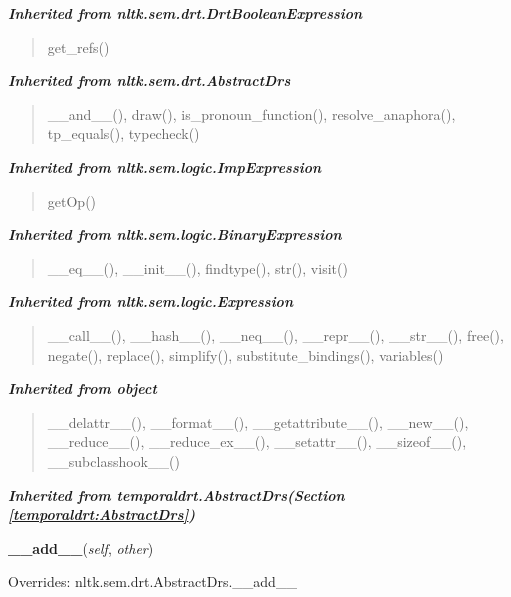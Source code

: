 \large{\textbf{\textit{Inherited from nltk.sem.drt.DrtBooleanExpression}}}

\begin{quote}
get\_refs()
\end{quote}

\large{\textbf{\textit{Inherited from nltk.sem.drt.AbstractDrs}}}

\begin{quote}
\_\_and\_\_(), draw(), is\_pronoun\_function(), resolve\_anaphora(), tp\_equals(), typecheck()
\end{quote}

\large{\textbf{\textit{Inherited from nltk.sem.logic.ImpExpression}}}

\begin{quote}
getOp()
\end{quote}

\large{\textbf{\textit{Inherited from nltk.sem.logic.BinaryExpression}}}

\begin{quote}
\_\_eq\_\_(), \_\_init\_\_(), findtype(), str(), visit()
\end{quote}

\large{\textbf{\textit{Inherited from nltk.sem.logic.Expression}}}

\begin{quote}
\_\_call\_\_(), \_\_hash\_\_(), \_\_neq\_\_(), \_\_repr\_\_(), \_\_str\_\_(), free(), negate(), replace(), simplify(), substitute\_bindings(), variables()
\end{quote}

\large{\textbf{\textit{Inherited from object}}}

\begin{quote}
\_\_delattr\_\_(), \_\_format\_\_(), \_\_getattribute\_\_(), \_\_new\_\_(), \_\_reduce\_\_(), \_\_reduce\_ex\_\_(), \_\_setattr\_\_(), \_\_sizeof\_\_(), \_\_subclasshook\_\_()
\end{quote}

\large{\textbf{\textit{Inherited from temporaldrt.AbstractDrs\textit{(Section \ref{temporaldrt:AbstractDrs})}}}}

    \vspace{0.5ex}

\hspace{.8\funcindent}\begin{boxedminipage}{\funcwidth}

    \raggedright \textbf{\_\_add\_\_}(\textit{self}, \textit{other})

\setlength{\parskip}{2ex}
\setlength{\parskip}{1ex}
      Overrides: nltk.sem.drt.AbstractDrs.\_\_add\_\_

    \end{boxedminipage}

